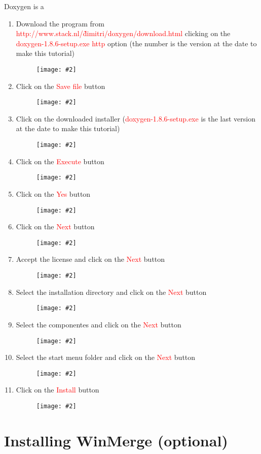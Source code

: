 \documentclass[a4paper]{article}
\newcommand{\FIG}[2]
{
	\begin{figure}[ht!]
	\centering
	\texttt{[image: \#2]}
	\end{figure}
}
\newcommand{\FIGURE}[1]{\FIG{0.35}{#1}}
\newcommand{\RED}[1] {\textcolor{red}{#1}}
\begin{document}
Doxygen is a

\begin{enumerate}

\item Download the program from
\RED{http://www.stack.nl/\~dimitri/doxygen/download.html} clicking
on the \RED{doxygen-1.8.6-setup.exe http} option (the number is the version at
the date to make this tutorial)
\FIGURE{doxygen-1.png}

\clearpage

\item Click on the \RED{Save file} button
\FIGURE{doxygen-2.png}

\item Click on the downloaded installer (\RED{doxygen-1.8.6-setup.exe} is the
last version at the date to make this tutorial)
\FIGURE{doxygen-3.png}

\clearpage

\item Click on the \RED{Execute} button
\FIGURE{doxygen-4.png}

\item Click on the \RED{Yes} button
\FIGURE{doxygen-5.png}

\clearpage

\item Click on the \RED{Next} button
\FIGURE{doxygen-6.png}

\item Accept the license and click on the \RED{Next} button
\FIGURE{doxygen-7.png}

\clearpage

\item Select the installation directory and click on the \RED{Next} button
\FIGURE{doxygen-8.png}

\item Select the componentes and click on the \RED{Next} button
\FIGURE{doxygen-9.png}

\clearpage

\item Select the start menu folder and click on the \RED{Next} button
\FIGURE{doxygen-10.png}

\item Click on the \RED{Install} button
\FIGURE{doxygen-11.png}

\end{enumerate}

\clearpage

\section{Installing WinMerge (optional)}
\end{document}
